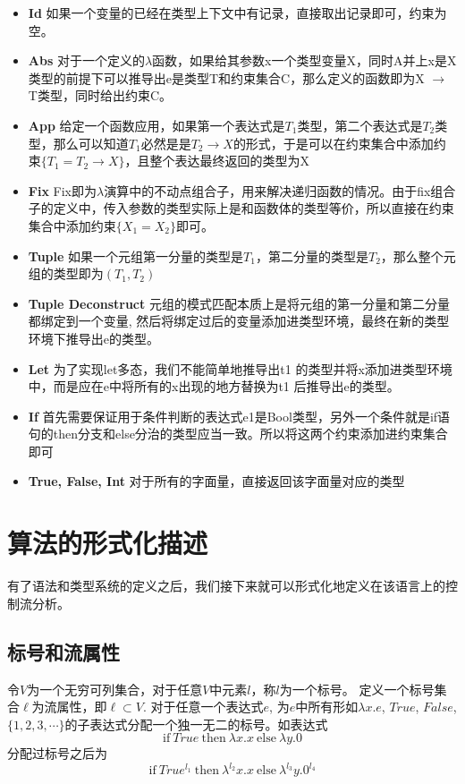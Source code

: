 \documentclass[UTF8, colorlinks]{pkuthss}
\begin{document}
	\begin{itemize}
		\item \textbf{Id} 如果一个变量的已经在类型上下文中有记录，直接取出记录即可，约束为空。
		\item \textbf{Abs} 对于一个定义的$\lambda$函数，如果给其参数x一个类型变量X，同时A并上x是X类型的前提下可以推导出e是类型T和约束集合C，那么定义的函数即为X $\to$ T类型，同时给出约束C。
		\item \textbf{App} 给定一个函数应用，如果第一个表达式是$T_1$类型，第二个表达式是$T_2$类型，那么可以知道$T_1$必然是是$T_2\to X$的形式，于是可以在约束集合中添加约束$\{T_1 = T_2\to X\}$，且整个表达最终返回的类型为X
		\item\textbf{Fix} Fix即为$\lambda$演算中的不动点组合子，用来解决递归函数的情况。由于fix组合子的定义中，传入参数的类型实际上是和函数体的类型等价，所以直接在约束集合中添加约束$\{X_1 = X_2\}$即可。
		\item\textbf{Tuple} 如果一个元组第一分量的类型是$T_1$，第二分量的类型是$T_2$，那么整个元组的类型即为$(T_1, T_2)$
		\item\textbf{Tuple Deconstruct} 元组的模式匹配本质上是将元组的第一分量和第二分量都绑定到一个变量, 然后将绑定过后的变量添加进类型环境，最终在新的类型环境下推导出e的类型。
		\item\textbf{Let} \cite{Milner}为了实现let多态，我们不能简单地推导出t1 的类型并将x添加进类型环境中，而是应在e中将所有的x出现的地方替换为t1 后推导出e的类型。
		\item\textbf{If} 首先需要保证用于条件判断的表达式e1是Bool类型，另外一个条件就是if语句的then分支和else分治的类型应当一致。所以将这两个约束添加进约束集合即可
		\item\textbf{True, False, Int} 对于所有的字面量，直接返回该字面量对应的类型
	\end{itemize}


\chapter{算法的形式化描述}
有了语法和类型系统的定义之后，我们接下来就可以形式化地定义在该语言上的控制流分析。
\section{标号和流属性}
	令$V$为一个无穷可列集合，对于任意$V$中元素$l$，称$l$为一个标号。 定义一个标号集合$\ell$为流属性，即$\ell\subset V$. 对于任意一个表达式$e$, 为$e$中所有形如$\lambda x.e$, $True$, $False$, $\{1, 2, 3,\cdots\}$的子表达式分配一个独一无二的标号。如表达式$$\mathrm{if}\ True\ \mathrm{then}\ \lambda x.x\ \mathrm{else}\ \lambda y.0$$分配过标号之后为$$\mathrm{if}\ True^{l_1}\ \mathrm{then}\ \lambda^{l_2} x.x\ \mathrm{else}\ \lambda^{l_3} y.0^{l_4}$$
\end{document}
